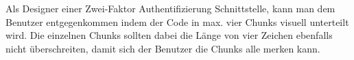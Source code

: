 Als Designer einer Zwei-Faktor Authentifizierung Schnittstelle, kann man dem
Benutzer entgegenkommen indem der Code in max. vier Chunks visuell unterteilt
wird. Die einzelnen Chunks sollten dabei die Länge von vier Zeichen ebenfalls
nicht überschreiten, damit sich der Benutzer die Chunks alle merken kann.
